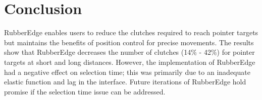 \section{Conclusion}
RubberEdge enables users to reduce the clutches required to reach pointer targets but maintains the benefits of position control for precise movements. The results show that RubberEdge decreases the number of clutches (14\% - 42\%) for pointer targets at short and long distances. However, the implementation of RubberEdge had a negative effect on selection time; this was primarily due to an inadequate elastic function and lag in the interface. Future iterations of RubberEdge hold promise if the selection time issue can be addressed.